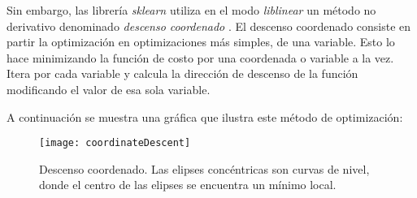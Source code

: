 Sin embargo, las librería \textit{sklearn} utiliza en el modo \textit{liblinear} un método no derivativo denominado \textit{descenso coordenado} \cite{sklearnLinearModel}. El descenso coordenado consiste en partir la optimización en optimizaciones más simples, de una variable. Esto lo hace minimizando la función de costo por una coordenada o variable a la vez. Itera por cada variable y calcula la dirección de descenso de la función modificando el valor de esa sola variable.

A continuación se muestra una gráfica que ilustra este método de optimización:

\begin{figure}[H]
\centering
\texttt{[image: coordinateDescent]}
\caption{Descenso coordenado. Las elipses concéntricas son curvas de nivel, donde el centro de las elipses se encuentra un mínimo local. \cite{wikipediaCoordinateDescent}}
\label{fig:coordinateDescent}
\end{figure}

